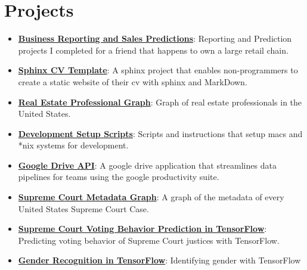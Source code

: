 \documentclass[letterpaper,11pt]{article}
\newcommand{\resumeItem}[2]{
  \item\small{
    \textbf{#1}{: #2 \vspace{-2pt}}
  }
}
\newcommand{\resumeSubItem}[2]{\resumeItem{#1}{#2}\vspace{-4pt}}
\newcommand{\resumeSubHeadingListStart}{\begin{itemize}[leftmargin=*]}
\newcommand{\resumeSubHeadingListEnd}{\end{itemize}}
\begin{document}
\section{Projects}
  \resumeSubHeadingListStart
    \resumeSubItem{\href{https://cv.jnapolitano.io/parts/analysis/business-analysis/index.html}{Business Reporting and Sales Predictions}}
      {Reporting and Prediction projects I completed for a friend that happens to own a large retail chain.}
    \resumeSubItem{\href{https://cv.jnapolitano.io/parts/reference/build-this-site/index.html}{Sphinx CV Template}}
      {A sphinx project that enables non-programmers to create a static website of their cv with sphinx and MarkDown.}
    \resumeSubItem{\href{https://cv.jnapolitano.io/parts/data/graph-database/index.html}{Real Estate Professional Graph}}
      {Graph of real estate professionals in the United States.}
    \resumeSubItem{\href{https://cv.jnapolitano.io/parts/reference/configuration/index.html}{Development Setup Scripts}}
      {Scripts and instructions that setup macs and *nix systems for development.}
    \resumeSubItem{\href{https://cv.jnapolitano.io/parts/python-development/google/index.html}{Google Drive API}}
      {A google drive application that streamlines data pipelines for teams using the google productivity suite.}
    \resumeSubItem{\href{https://cv.jnapolitano.io/parts/analysis/political-analysis/sup-court/project-sup-court-meta-data-graph/index.html}{Supreme Court Metadata Graph}}
      {A graph of the metadata of every United States Supreme Court Case.}
     \resumeSubItem{\href{https://cv.jnapolitano.io/parts/ml-ai/tensorflow/project-supcourt-tensorflow/index.html}{Supreme Court Voting Behavior Prediction in TensorFlow}}
      {Predicting voting behavior of Supreme Court justices with TensorFlow.}
     \resumeSubItem{\href{https://cv.jnapolitano.io/parts/ml-ai/tensorflow/project-gender-recognition/index.html}{Gender Recognition in TensorFlow}}
      {Identifying gender with TensorFlow}
  \resumeSubHeadingListEnd




\end{document}
